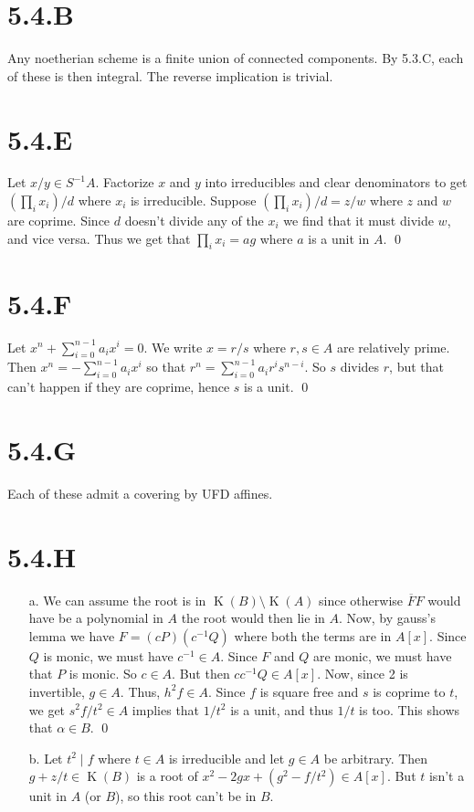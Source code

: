 \documentclass{article}
\begin{document}
\section{5.4.B}
Any noetherian scheme is a finite union of connected components. By 5.3.C, each of these is then integral. The reverse implication is trivial.

\section{5.4.E}
Let $x/y \in S^{-1}A$. Factorize $x$ and $y$ into irreducibles and clear denominators to get $(\prod_i x_i)/d$ where $x_i$ is irreducible. Suppose $(\prod_i x_i)/d=z/w$ where $z$ and $w$ are coprime. Since $d$ doesn't divide any of the $x_i$ we find that it must divide $w$, and vice versa. Thus we get that $\prod_i x_i=ag$ where $a$ is a unit in $A$. \qed

\section{5.4.F}
Let $x^n+\sum_{i=0}^{n-1} a_ix^i=0$. We write $x=r/s$ where $r, s \in A$ are relatively prime. Then $x^n=-\sum_{i=0}^{n-1} a_ix^{i}$ so that $r^n=\sum_{i=0}^{n-1} a_ir^is^{n-i}$. So $s$ divides $r$, but that can't happen if they are coprime, hence $s$ is a unit. \qed

\section{5.4.G}
Each of these admit a covering by UFD affines.

\section{5.4.H}
\begin{itemize}
    \item [a.] We can assume the root is in $\operatorname{K}(B) \setminus \operatorname{K}(A)$ since otherwise $\overline{F}F$ would have be a polynomial in $A$ the root would then lie in $A$. Now, by gauss's lemma we have $F=(cP)(c^{-1}Q)$ where both the terms are in $A[x]$. Since $Q$ is monic, we must have $c^{-1} \in A$. Since $F$ and $Q$ are monic, we must have that $P$ is monic. So $c \in A$. But then $cc^{-1}Q \in A[x]$. Now, since 2 is invertible, $g\in A$. Thus, $h^2f \in A$. Since $f$ is square free and $s$ is coprime to $t$, we get $s^2f/t^2 \in A$ implies that $1/t^2$ is a unit, and thus $1/t$ is too. This shows that $\alpha \in B$. \qed
    \item[b.] Let $t^2 \mid f$ where $t \in A$ is irreducible and let $g \in A$ be arbitrary. Then $g+z/t \in \operatorname{K}(B)$ is a root of $x^2-2gx+(g^2-f/t^2) \in A[x]$. But $t$ isn't a unit in $A$ (or $B$), so this root can't be in $B$.
\end{itemize}
\end{document}
